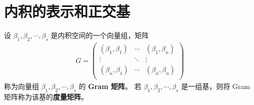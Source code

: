 \documentclass[../../main.tex]{subfiles}
\begin{document}
\section{内积的表示和正交基}

\begin{definition}[Gram矩阵和度量矩阵]\label{definition:Gram矩阵和度量矩阵}
设 \(\beta_1,\beta_2,\cdots,\beta_s\) 是内积空间的一个向量组，矩阵
\begin{align*}
G=\left( \begin{matrix}
\left( \beta _1,\beta _1 \right)&		\cdots&		\left( \beta _1,\beta _n \right)\\
\vdots&		\ddots&		\vdots\\
\left( \beta _n,\beta _1 \right)&		\cdots&		\left( \beta _n,\beta _n \right)\\
\end{matrix} \right) 
\end{align*}
称为向量组 \(\beta_1,\beta_2,\cdots,\beta_s\) 的 \textbf{Gram 矩阵}。
若 \(\beta_1,\beta_2,\cdots,\beta_s\) 是一组基，则将 Gram 矩阵称为该基的\textbf{度量矩阵}。 
\end{definition}
\end{document}
